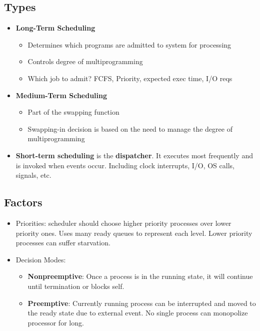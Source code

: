 \documentclass[fontsize=5pt]{scrartcl}
\begin{document}
\begin{multicols}{3}
      \subsection{Types}
      \begin{itemize}
       \item \textbf{Long-Term Scheduling}
       \begin{itemize}
         \item Determines which programs are admitted to system for processing
         \item Controls degree of multiprogramming
         \item Which job to admit? FCFS, Priority, expected exec time, I/O reqs
       \end{itemize}
       \item \textbf{Medium-Term Scheduling}
       \begin{itemize}
         \item Part of the swapping function
         \item Swapping-in decision is based on the need to manage the degree of multiprogramming
       \end{itemize}
       \item \textbf{Short-term scheduling} is the \textbf{dispatcher}. It executes most frequently and is invoked when events occur. Including clock interrupts, I/O, OS calls, signals, etc.
      \end{itemize}
      \subsection{Factors}
        \begin{itemize}
        \item Priorities: scheduler should choose higher priority processes over lower priority ones. Uses many ready queues to represent each level. Lower priority processes can suffer starvation.
        \item Decision Modes:
          \begin{itemize}
            \item \textbf{Nonpreemptive}: Once a process is in the running state, it will continue until termination or blocks self.
            \item \textbf{Preemptive}: Currently running process can be interrupted and moved to the ready state due to external event. No single process can monopolize processor for long.
          \end{itemize}
        \end{itemize}

\end{multicols}
\end{document}
